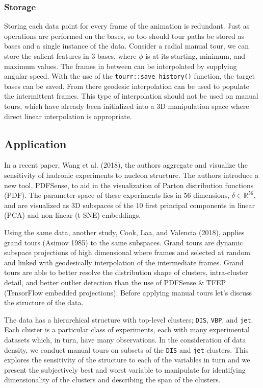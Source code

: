 \hypertarget{storage}{%
\subsubsection{Storage}\label{storage}}

Storing each data point for every frame of the animation is redundant. Just as operations are performed on the bases, so too should tour paths be stored as bases and a single instance of the data. Consider a radial manual tour, we can store the salient features in 3 bases, where \(\phi\) is at its starting, minimum, and maximum values. The frames in between can be interpolated by supplying angular speed. With the use of the \texttt{tourr::save\_history()} function, the target bases can be saved. From there geodesic interpolation can be used to populate the intermittent frames. This type of interpolation should not be used on manual tours, which have already been initialized into a 3D manipulation space where direct linear interpolation is appropriate.

\hypertarget{sec:application}{%
\subsection{Application}\label{sec:application}}

In a recent paper, Wang et al. (2018), the authors aggregate and visualize the sensitivity of hadronic experiments to nucleon structure. The authors introduce a new tool, PDFSense, to aid in the visualization of Parton distribution functions (PDF). The parameter-space of these experiments lies in 56 dimensions, \(\delta \in \mathbb{R}^{56}\), and are visualized as 3D subspaces of the 10 first principal components in linear (PCA) and non-linear (t-SNE) embeddings.

Using the same data, another study, Cook, Laa, and Valencia (2018), applies grand tours (Asimov 1985) to the same subspaces. Grand tours are dynamic subspace projections of high dimensional where frames and selected at random and linked with geodesically interpolation of the intermediate frames. Grand tours are able to better resolve the distribution shape of clusters, intra-cluster detail, and better outlier detection than the use of PDFSense \& TFEP (TensorFlow embedded projections). Before applying manual tours let's discuss the structure of the data.

The data has a hierarchical structure with top-level clusters; \texttt{DIS}, \texttt{VBP}, and \texttt{jet}. Each cluster is a particular class of experiments, each with many experimental datasets which, in turn, have many observations. In the consideration of data density, we conduct manual tours on subsets of the \texttt{DIS} and \texttt{jet} clusters. This explores the sensitivity of the structure to each of the variables in turn and we present the subjectively best and worst variable to manipulate for identifying dimensionality of the clusters and describing the span of the clusters.

